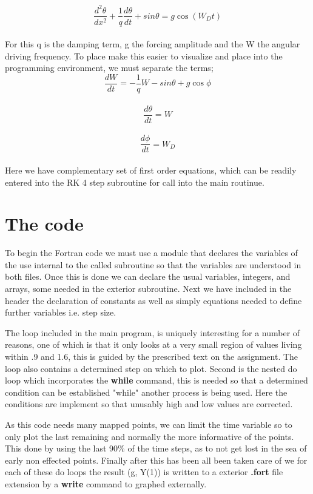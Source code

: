\documentclass[12pt,letterpaper,notitlepage]{article}
\begin{document}
	\begin{equation}
	{\frac{d^2\theta}{dx^2}+\frac{1}{q}\frac{d\theta}{dt}+sin\theta=g\cos(W_D t)}	
	\end{equation}
\\
For this q is the damping term, g the forcing amplitude and the W the angular driving frequency. 
To place make this easier to visualize and place into the programming environment, we must separate the terms; 
\\
	\begin{equation}
	{\frac{dW}{dt}=-\frac{1}{q}W-sin\theta+g\cos\phi}
	\end{equation}	
\\
	\begin{equation}
	{\frac{d\theta}{dt}=W}
	\end{equation}
\\
	\begin{equation}
	{\frac{d\phi}{dt}=W_D}	
	\end{equation}
\\
Here we have complementary set of first order equations, which can be readily entered into the RK 4 step subroutine for call into the main routinue.  

\section{The code}

To begin the Fortran code we must use a module that declares the variables of the use internal to the called subroutine so that the variables are understood in both files. Once this is done we can declare the usual variables, integers, and arrays, some needed in the exterior subroutine. Next we have included  in the header the declaration of constants as well as simply equations needed to define further variables i.e. step size. 

The loop included in the main program, is uniquely interesting for a number of reasons, one of which is that it only looks at a very small region of values living within .9 and 1.6, this is guided by the prescribed text on the assignment. The loop also contains a determined step on which to plot. Second is the nested do loop which incorporates the \textbf{while} command, this is needed so that a determined condition can be established "while" another process is being used. Here the conditions are implement so that unusably high and low values are corrected. 

As this code needs many mapped points, we can limit the time variable so to only plot the last remaining and normally the more informative of the points. This done by using the last 90\% of the time steps, as to not get lost in the sea of early non effected points. Finally after this has been all been taken care of we for each of these do loops the result (g, Y(1)) is written to a exterior \textbf{.fort} file extension by a \textbf{write} command to graphed externally. 
\newpage
\end{document}
